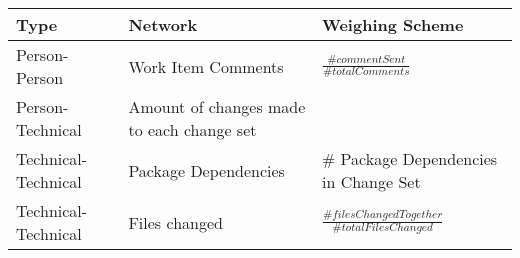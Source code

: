 \begin{tabularx}{\columnwidth}{|X >{\raggedright}X >{\raggedright}X|}
\hline
Type & Network & Weighing Scheme \\\hline
Person-Person & Work Item Comments & $\frac{\# commentSent}{\# totalComments}$ \\\hline
Person-Technical & Amount of changes made to each change set & \\\hline
Technical-Technical & Package Dependencies & \# Package Dependencies in Change Set \\\hline
Technical-Technical & Files changed & $\frac{\#filesChangedTogether}{\#totalFilesChanged}$ \\\hline
\end{tabularx}